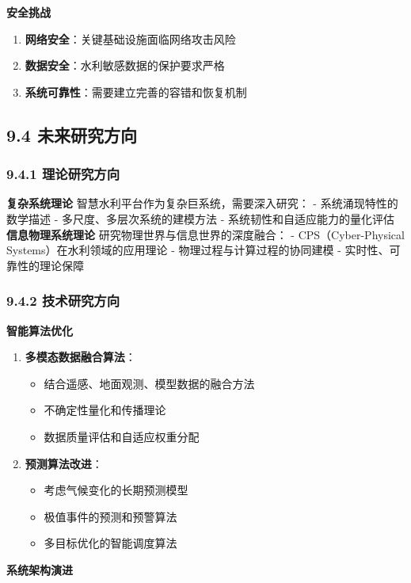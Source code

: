\textbf{安全挑战} \begin{enumerate} \def\labelenumi{\arabic{enumi}.} \tightlist \item \textbf{网络安全}：关键基础设施面临网络攻击风险 \item
\textbf{数据安全}：水利敏感数据的保护要求严格 \item \textbf{系统可靠性}：需要建立完善的容错和恢复机制 \end{enumerate} \subsection{9.4
未来研究方向}\label{ux672aux6765ux7814ux7a76ux65b9ux5411} \subsubsection{9.4.1
理论研究方向}\label{ux7406ux8bbaux7814ux7a76ux65b9ux5411} \textbf{复杂系统理论} 智慧水利平台作为复杂巨系统，需要深入研究： - 系统涌现特性的数学描述 - 多尺度、多层次系统的建模方法
- 系统韧性和自适应能力的量化评估 \textbf{信息物理系统理论} 研究物理世界与信息世界的深度融合： - CPS（Cyber-Physical Systems）在水利领域的应用理论 - 物理过程与计算过程的协同建模 -
实时性、可靠性的理论保障 \subsubsection{9.4.2 技术研究方向}\label{ux6280ux672fux7814ux7a76ux65b9ux5411} \textbf{智能算法优化} \begin{enumerate}
\def\labelenumi{\arabic{enumi}.} \tightlist \item \textbf{多模态数据融合算法}： \begin{itemize} \tightlist \item
结合遥感、地面观测、模型数据的融合方法 \item 不确定性量化和传播理论 \item 数据质量评估和自适应权重分配 \end{itemize} \item \textbf{预测算法改进}： \begin{itemize}
\tightlist \item 考虑气候变化的长期预测模型 \item 极值事件的预测和预警算法 \item 多目标优化的智能调度算法 \end{itemize} \end{enumerate} \textbf{系统架构演进}
